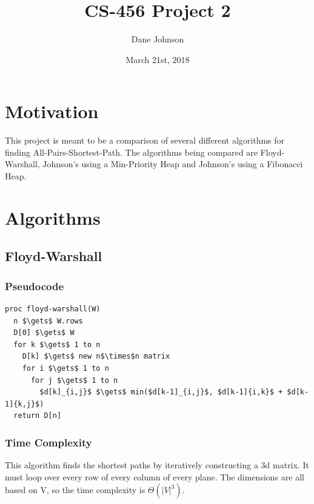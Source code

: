 \documentclass[a4paper,12pt]{article}
\title{CS-456 Project 2}
\author{Dane Johnson}
\date{March 21st, 2018}
\begin{document}
\maketitle
\newpage
\section{Motivation}

This project is meant to be a comparison of several different algorithms for finding All-Pairs-Shortest-Path.
The algorithms being compared are Floyd-Warshall, Johnson's using a Min-Priority Heap and Johnson's using a Fibonacci Heap. 

\section{Algorithms}
\subsection{Floyd-Warshall}
\subsubsection{Pseudocode}
\begin{lstlisting}[mathescape=true]
proc floyd-warshall(W)
  n $\gets$ W.rows
  D[0] $\gets$ W
  for k $\gets$ 1 to n
    D[k] $\gets$ new n$\times$n matrix
    for i $\gets$ 1 to n
      for j $\gets$ 1 to n
        $d[k]_{i,j}$ $\gets$ min($d[k-1]_{i,j}$, $d[k-1]{i,k}$ + $d[k-1]{k,j}$)
  return D[n] 
\end{lstlisting}
\subsubsection{Time Complexity}
This algorithm finds the shortest paths by iteratively constructing a 3d matrix. It must loop over every row of every column of every plane.
The dimensions are all based on V, so the time complexity is $\Theta(|V|^3)$.
\end{document}
